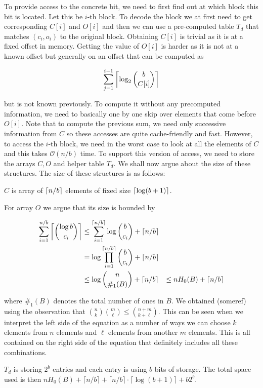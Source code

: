 To provide access to the concrete bit, we need to first find out at which block this bit is located.
Let this be $i$-th block. To decode the block we at first need to get corresponding $C[i]$ and
$O[i]$ and then we can use a pre-computed table $T_d$ that matches $(c_i, o_i)$ to the original
block. Obtaining $C[i]$ is trivial as it is at a fixed offset in memory. Getting the value of
$O[i]$ is harder as it is not at a known offset but generally on an offset that can be computed
as

                $$\sum_{j=1}^{i-1} \left\lceil \log_2{b\choose C[i]} \right\rceil$$

but is not known previously. To compute it without any precomputed information,
we need to basically one by one skip over elements that come before $O[i]$.
Note that to compute the previous sum, we need only successive information from $C$ so these
accesses are quite cache-friendly and fast. However, to access the $i$-th block, we need in the
worst case to look at all the elements of $C$ and this takes $\mathcal{O}(n/b)$ time. To support
this version of access, we need to store the arrays $C, O$ and helper table $T_d$. We shall
now argue about the size of these structures. The size of these structures is
as follows:

$C$ is array of $\left\lceil n/b \right\rceil$ elements of fixed size $\left\lceil \log(b+1) \right\rceil$.

For array $O$ we argue that its size is bounded by

\begin{align*}
    \sum_{i=1}^{n/b} \left\lceil {\log b\choose c_i} \right\rceil
    &\leq \sum_{i=1}^{\left\lceil n/b \right\rceil} \log {b\choose c_i} + \left\lceil n/b \right\rceil \\
    &= \log\prod_{i=1}^{\left\lceil n/b \right\rceil} {b\choose c_i} + \left\lceil n/b \right\rceil \\
    &\leq \log{n\choose \#_1(B)} + \left\lceil n/b \right\rceil &\leq nH_0(B) + \left\lceil n/b \right\rceil
\end{align*}

where $\#_1(B)$ denotes the total number of ones in $B$. We obtained (someref) using the
observation that ${n\choose k} {m\choose \ell} \leq {n+m\choose k+\ell}$. This can be seen
when we interpret the left side of the equation as a number of ways we can choose $k$ elements
from $n$ elements and $\ell$ elements from another $m$ elements. This is all contained on the
right side of the equation that definitely includes all these combinations.

$T_d$ is storing $2^b$ entries and each entry is using $b$ bits of storage.
The total space used is then $nH_0(B) + \lceil n/b \rceil + \lceil n/b \rceil \cdot \lceil \log(b+1) \rceil + b2^b$.

